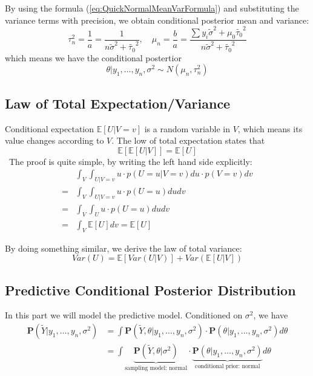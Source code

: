 By using the formula (\ref{eq:QuickNormalMeanVarFormula}) and substituting the variance terms with precision, we obtain conditional posterior mean and variance:
\begin{equation*}
    \tau_n^2 = \frac{1}{a} = \frac{1}{n\tilde{\sigma}^2 + \tilde{\tau_0}^2}, \quad \mu_n = \frac{b}{a} = \frac{\sum y_i \tilde{\sigma}^2 + \mu_0\tilde{\tau_0}^2}{n\tilde{\sigma}^2 + \tilde{\tau_0}^2}
\end{equation*}
which means we have the conditional postertior
\begin{equation*}
    \theta | y_1, \ldots, y_n, \sigma^2 \sim N(\mu_n, \tau_n^2)
\end{equation*}

\subsection{Law of Total Expectation/Variance}
Conditional expectation $\mathbb{E}[U|V=v]$ is a random variable in $V$, which means its value changes according to $V$. The low of total expectation states that 
\begin{equation*}
    \mathbb{E}[\mathbb{E}[U|V]] = \mathbb{E}[U]
\end{equation*}\
The proof is quite simple, by writing the left hand side explicitly:
\begin{align*}
    &\int_{V}\int_{U|V=v}u \cdot p(U=u|V=v) du \cdot p(V=v)dv \\
    =& \int_{V}\int_{U|V=v}u \cdot p(U=u) dudv \\
    =& \int_{V}\int_{U}u \cdot p(U=u) dudv \\
    =& \int_{V} \mathbb{E}[U] dv = \mathbb{E}[U]
\end{align*}

By doing something similar, we derive the law of total variance:
\begin{equation*}
    Var(U) = \mathbb{E}[Var(U|V)] + Var(\mathbb{E}[U|V])
\end{equation*}

\subsection{Predictive Conditional Posterior Distribution}
In this part we will model the predictive model. Conditioned on $\sigma^2$, we have
\begin{align*}
    \mathbf{P}(\tilde{Y} | y_1, \ldots, y_n, \sigma^2) &= \int \mathbf{P}(\tilde{Y},\theta | y_1, \ldots, y_n, \sigma^2) \cdot \mathbf{P}(\theta | y_1, \ldots, y_n, \sigma^2) d\theta \\
    &= \int \underbrace{\mathbf{P}(\tilde{Y},\theta | \sigma^2)}_{\text{sampling model: normal}} \cdot \underbrace{\mathbf{P}(\theta | y_1, \ldots, y_n, \sigma^2)}_{\text{conditional prior: normal}} d\theta
\end{align*}

